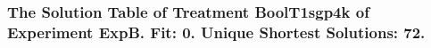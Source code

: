  \begin{frame}
 \fontsize{8pt}{9pt}\selectfont
 \frametitle{ The Solution Table of Treatment BoolT1sgp4k of Experiment ExpB. Fit: 0. Unique Shortest Solutions: 72. }

 \label{ExpBSolutionTable007.tex}  
 \end{frame}

